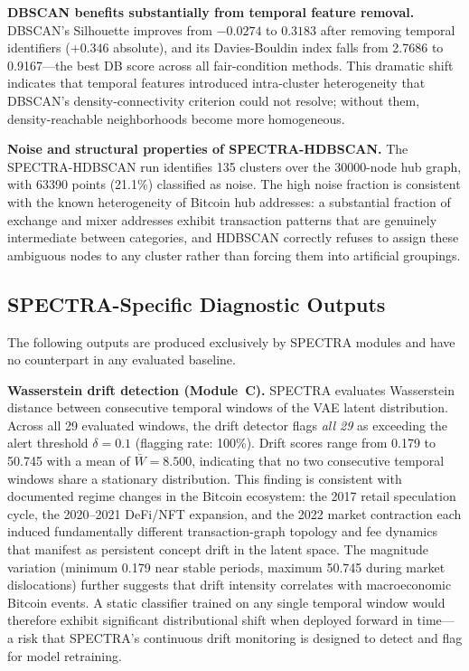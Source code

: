 \textbf{DBSCAN benefits substantially from temporal feature removal.}
DBSCAN's Silhouette improves from $-\num{0.0274}$ to $\num{0.3183}$ after
removing temporal identifiers ($+\num{0.346}$ absolute), and its
Davies-Bouldin index falls from \num{2.7686} to \num{0.9167}---the best
DB score across all fair-condition methods.
This dramatic shift indicates that temporal features introduced intra-cluster
heterogeneity that DBSCAN's density-connectivity criterion could not resolve;
without them, density-reachable neighborhoods become more homogeneous.

\textbf{Noise and structural properties of SPECTRA-HDBSCAN.}
The SPECTRA-HDBSCAN run identifies \num{135} clusters over the
\num{30000}-node hub graph, with \num{63390} points (\num{21.1}\%)
classified as noise.
The high noise fraction is consistent with the known heterogeneity of
Bitcoin hub addresses: a substantial fraction of exchange and mixer addresses
exhibit transaction patterns that are genuinely intermediate between
categories, and HDBSCAN correctly refuses to assign these ambiguous
nodes to any cluster rather than forcing them into artificial groupings.


\subsection{SPECTRA-Specific Diagnostic Outputs}
\label{subsec:spectra_outputs}

The following outputs are produced exclusively by SPECTRA modules and
have no counterpart in any evaluated baseline.

\textbf{Wasserstein drift detection (Module~C).}
SPECTRA evaluates Wasserstein distance between consecutive temporal windows
of the VAE latent distribution.
Across all \num{29} evaluated windows, the drift detector flags
\emph{all \num{29}} as exceeding the alert threshold $\delta = 0.1$
(flagging rate: \num{100}\%).
Drift scores range from \num{0.179} to \num{50.745} with a mean of
$\bar{W} = \num{8.500}$, indicating that no two consecutive temporal
windows share a stationary distribution.
This finding is consistent with documented regime changes in the Bitcoin
ecosystem: the 2017 retail speculation cycle, the 2020--2021
DeFi/NFT expansion, and the 2022 market contraction each induced
fundamentally different transaction-graph topology and fee dynamics that
manifest as persistent concept drift in the latent space.
The magnitude variation (minimum \num{0.179} near stable periods,
maximum \num{50.745} during market dislocations) further suggests
that drift intensity correlates with macroeconomic Bitcoin events.
A static classifier trained on any single temporal window would therefore
exhibit significant distributional shift when deployed forward in time---
a risk that SPECTRA's continuous drift monitoring is designed to detect
and flag for model retraining.

